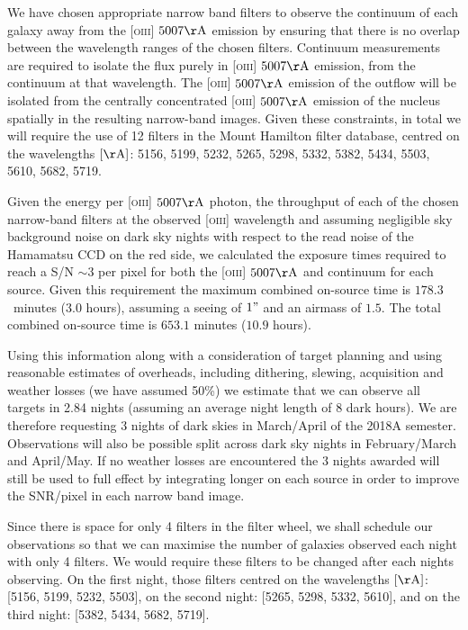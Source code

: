 \documentclass[12pt]{article}
\begin{document}
We have chosen appropriate narrow band filters to observe the continuum of each galaxy away from the \textsc{[oiii]} $5007\rm{\AA}$ emission by ensuring that there is no overlap between the wavelength ranges of the chosen filters.  Continuum measurements are required to isolate the flux purely in \textsc{[oiii]} $5007\rm{\AA}$ emission, from the continuum at that wavelength. The \textsc{[oiii]} $5007\rm{\AA}$ emission of the outflow will be isolated from the centrally concentrated \textsc{[oiii]} $5007\rm{\AA}$ emission of the nucleus spatially in the resulting narrow-band images. Given these constraints, in total we will require the use of 12 filters in the Mount Hamilton filter database, centred on the wavelengths $[\rm{\AA}]$: 5156, 5199, 5232, 5265, 5298, 5332, 5382, 5434, 5503, 5610, 5682, 5719. 

\vspace{0.25em}

Given the energy per \textsc{[oiii]} $5007\rm{\AA}$ photon, the throughput of each of the chosen narrow-band filters at the observed \textsc{[oiii]} wavelength and assuming negligible sky background noise on dark sky nights with respect to the read noise of the Hamamatsu CCD on the red side, we calculated the exposure times required to reach a S/N $\sim 3$ per pixel for both the \textsc{[oiii]} $5007\rm{\AA}$ and continuum for each source. Given this requirement the maximum combined on-source time is $178.3$~minutes ($3.0$ hours), assuming a seeing of $1"$ and an airmass of $1.5$. The total combined on-source time is $653.1$ minutes ($10.9$ hours).  
\vspace{0.25em}

Using this information along with a consideration of target planning and using reasonable estimates of overheads, including dithering, slewing, acquisition and weather losses (we have assumed 50\%) we estimate that we can observe all targets in 2.84 nights (assuming an average night length of $8$ dark hours). We are therefore requesting 3 nights of dark skies in March/April of the 2018A semester. Observations will also be possible split across dark sky nights in February/March and April/May. If no weather losses are encountered the $3$ nights awarded will still be used to full effect by integrating longer on each source in order to improve the SNR/pixel in each narrow band image. 

Since there is space for only 4 filters in the filter wheel, we shall schedule our observations so that we can maximise the number of galaxies observed each night with only 4 filters. We would require these filters to be changed after each nights observing.  On the first night, those filters centred on the wavelengths $[\rm{\AA}]$: [5156, 5199, 5232, 5503], on the second night: [5265, 5298, 5332, 5610], and on the third night: [5382, 5434, 5682, 5719]. 
\end{document}
